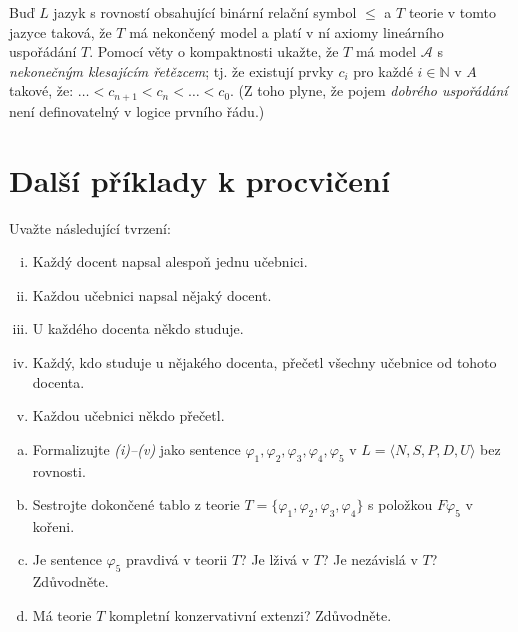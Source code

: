 \begin{problem} 
    
    Buď $L$ jazyk s rovností obsahující binární relační symbol $\le$ a $T$ teorie v tomto jazyce taková, že $T$ má nekončený model a platí v ní axiomy lineárního uspořádání $T$. Pomocí věty o kompaktnosti ukažte, že $T$ má model $\mathcal{A}$ s \emph{nekonečným klesajícím řetězcem}; tj. že existují prvky $c_i$ pro každé $i\in \mathbb{N}$ v $A$ takové, že: $\dots < c_{n+1} < c_n< \dots <c_0$.
    (Z toho plyne, že pojem \emph{dobrého uspořádání} není definovatelný v logice prvního řádu.)

    \begin{solution}
                    
    \end{solution}

\end{problem}




\section*{Další příklady k procvičení}


\begin{problem}
    
    Uvažte následující tvrzení:
    \begin{enumerate}[(i)]\it
        \item Každý docent napsal alespoň jednu učebnici.
        \item Každou učebnici napsal nějaký docent.
        \item U každého docenta někdo studuje.
        \item Každý, kdo studuje u nějakého docenta, přečetl všechny učebnice od tohoto docenta.
        \item Každou učebnici někdo přečetl.
    \end{enumerate}    
    \begin{enumerate}[(a)]
        \item Formalizujte {\it(i)--(v)} jako sentence $\varphi_1,\varphi_2,\varphi_3,\varphi_4,\varphi_5$ v $L=\langle N, S, P, D, U\rangle$ bez rovnosti.
        \item Sestrojte dokončené tablo z teorie $T=\{\varphi_1,\varphi_2,\varphi_3,\varphi_4\}$ s položkou $F\varphi_5$ v kořeni.
        \item Je sentence $\varphi_5$ pravdivá v teorii $T$? Je lživá v $T$? Je nezávislá v $T$? Zdůvodněte.
        \item Má teorie $T$ kompletní konzervativní extenzi? Zdůvodněte.
    \end{enumerate}

\end{problem}



